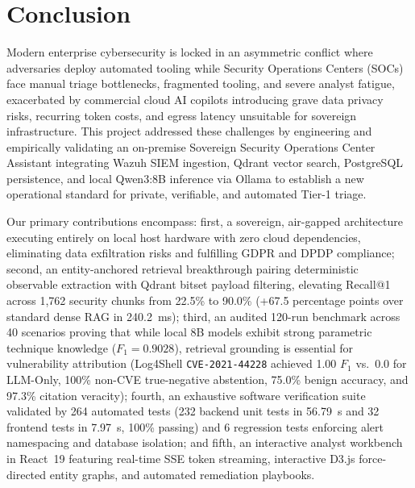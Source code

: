 \chapter{Conclusion}
\label{chap:conclusion}

Modern enterprise cybersecurity is locked in an asymmetric conflict where adversaries deploy automated tooling while Security Operations Centers (SOCs) face manual triage bottlenecks, fragmented tooling, and severe analyst fatigue, exacerbated by commercial cloud AI copilots introducing grave data privacy risks, recurring token costs, and egress latency unsuitable for sovereign infrastructure. This project addressed these challenges by engineering and empirically validating an on-premise Sovereign Security Operations Center Assistant integrating Wazuh SIEM ingestion, Qdrant vector search, PostgreSQL persistence, and local Qwen3:8B inference via Ollama to establish a new operational standard for private, verifiable, and automated Tier-1 triage.

Our primary contributions encompass: first, a sovereign, air-gapped architecture executing entirely on local host hardware with zero cloud dependencies, eliminating data exfiltration risks and fulfilling GDPR and DPDP compliance; second, an entity-anchored retrieval breakthrough pairing deterministic observable extraction with Qdrant bitset payload filtering, elevating Recall@1 across 1,762 security chunks from 22.5\% to 90.0\% (+67.5 percentage points over standard dense RAG in 240.2~ms); third, an audited 120-run benchmark across 40 scenarios proving that while local 8B models exhibit strong parametric technique knowledge ($F_1 = 0.9028$), retrieval grounding is essential for vulnerability attribution (Log4Shell \texttt{CVE-2021-44228} achieved 1.00 $F_1$ vs.\ 0.0 for LLM-Only, 100\% non-CVE true-negative abstention, 75.0\% benign accuracy, and 97.3\% citation veracity); fourth, an exhaustive software verification suite validated by 264 automated tests (232 backend unit tests in 56.79~s and 32 frontend tests in 7.97~s, 100\% passing) and 6 regression tests enforcing alert namespacing and database isolation; and fifth, an interactive analyst workbench in React~19 featuring real-time SSE token streaming, interactive D3.js force-directed entity graphs, and automated remediation playbooks.

